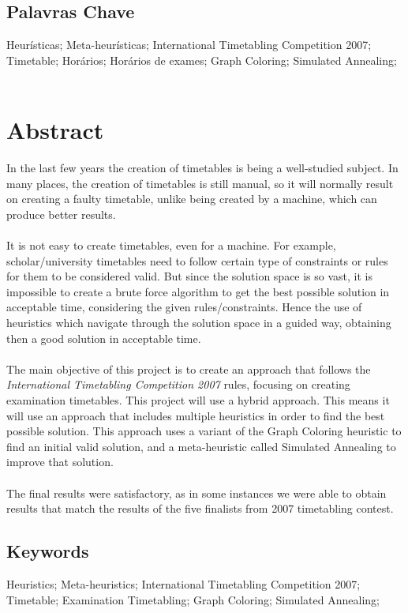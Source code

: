\section*{Palavras Chave}

Heurísticas; Meta-heurísticas; International Timetabling Competition 2007; Timetable; Horários; Horários de exames; Graph Coloring; Simulated Annealing;
\

\chapter*{Abstract}

In the last few years the creation of timetables is being a well-studied subject. In many places, the creation of timetables is still manual, so it will normally result on creating a faulty timetable, unlike being created by a machine, which can produce better results.\\
\\
It is not easy to create timetables, even for a machine. For example, scholar/university timetables need to follow certain type of constraints or rules for them to be considered valid. But since the solution space is so vast, it is impossible to create a brute force algorithm to get the best possible solution in acceptable time, considering the given rules/constraints. Hence the use of heuristics which navigate through the solution space in a guided way, obtaining then a good solution in acceptable time.\\
\\
The main objective of this project is to create an approach that follows the \textit{International Timetabling Competition 2007} rules, focusing on creating examination timetables. This project will use a hybrid approach. This means it will use an approach that includes multiple heuristics in order to find the best possible solution. This approach uses a variant of the Graph Coloring heuristic to find an initial valid solution, and a meta-heuristic called Simulated Annealing to improve that solution.\\
\\
The final results were satisfactory, as in some instances we were able to obtain results that match the results of the five finalists from 2007 timetabling contest.


\section*{Keywords}

Heuristics; Meta-heuristics; International Timetabling Competition 2007; Timetable; Examination Timetabling; Graph Coloring; Simulated Annealing;

